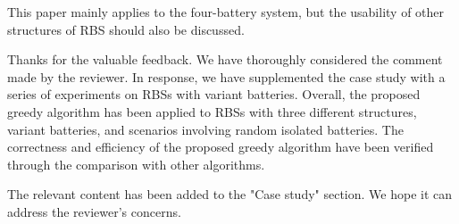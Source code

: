 \begin{revcomment}
  This paper mainly applies to the four-battery system, but the usability of other structures of RBS should also be discussed.
\end{revcomment}
\begin{revresponse}

Thanks for the valuable feedback. 
We have thoroughly considered the comment made by the reviewer.
In response, we have supplemented the case study with a series of experiments on RBSs with variant batteries. 
Overall, the proposed greedy algorithm has been applied to RBSs with three different structures, variant batteries, and scenarios involving random isolated batteries. 
The correctness and efficiency of the proposed greedy algorithm have been verified through the comparison with other algorithms.

The relevant content has been added to the "Case study" section. 
We hope it can address the reviewer's concerns.

\end{revresponse}